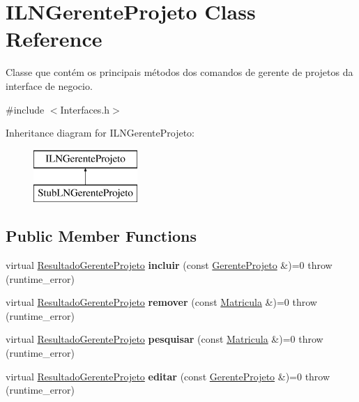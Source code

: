 \hypertarget{class_i_l_n_gerente_projeto}{}\section{I\+L\+N\+Gerente\+Projeto Class Reference}
\label{class_i_l_n_gerente_projeto}


Classe que contém os principais métodos dos comandos de gerente de projetos da interface de negocio.  




{\ttfamily \#include $<$Interfaces.\+h$>$}

Inheritance diagram for I\+L\+N\+Gerente\+Projeto\+:\begin{figure}[H]
\begin{center}
\leavevmode
\includegraphics[height=2.000000cm]{class_i_l_n_gerente_projeto}
\end{center}
\end{figure}
\subsection*{Public Member Functions}
\begin{DoxyCompactItemize}
\item 
\hypertarget{class_i_l_n_gerente_projeto_ac27caf6424cdbd188cb7e1c985d0e3a3}{}\label{class_i_l_n_gerente_projeto_ac27caf6424cdbd188cb7e1c985d0e3a3} 
virtual \hyperlink{class_resultado_gerente_projeto}{Resultado\+Gerente\+Projeto} {\bfseries incluir} (const \hyperlink{class_gerente_projeto}{Gerente\+Projeto} \&)=0  throw (runtime\+\_\+error)
\item 
\hypertarget{class_i_l_n_gerente_projeto_ad8c71f1aba202c932543bc9712f4d478}{}\label{class_i_l_n_gerente_projeto_ad8c71f1aba202c932543bc9712f4d478} 
virtual \hyperlink{class_resultado_gerente_projeto}{Resultado\+Gerente\+Projeto} {\bfseries remover} (const \hyperlink{class_matricula}{Matricula} \&)=0  throw (runtime\+\_\+error)
\item 
\hypertarget{class_i_l_n_gerente_projeto_a488643773ff8a07926a27e70005e6607}{}\label{class_i_l_n_gerente_projeto_a488643773ff8a07926a27e70005e6607} 
virtual \hyperlink{class_resultado_gerente_projeto}{Resultado\+Gerente\+Projeto} {\bfseries pesquisar} (const \hyperlink{class_matricula}{Matricula} \&)=0  throw (runtime\+\_\+error)
\item 
\hypertarget{class_i_l_n_gerente_projeto_a9aa856e1d83880b5022315f08152bc68}{}\label{class_i_l_n_gerente_projeto_a9aa856e1d83880b5022315f08152bc68} 
virtual \hyperlink{class_resultado_gerente_projeto}{Resultado\+Gerente\+Projeto} {\bfseries editar} (const \hyperlink{class_gerente_projeto}{Gerente\+Projeto} \&)=0  throw (runtime\+\_\+error)
\end{DoxyCompactItemize}


